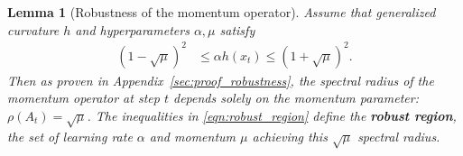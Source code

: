 \documentclass{article} %
\newtheorem{lemma}[theorem]{Lemma}
\newcommand{\mat}[1]{\bm{\mathit{#1}}}
\begin{document}
\begin{lemma}[Robustness of the momentum operator]
\label{lem:robustness}
Assume that generalized curvature $h$ and hyperparameters $\alpha,\mu$ satisfy
\begin{align}
{(1-\sqrt{\mu})^2} &\leq \alpha h(x_t) \leq {(1+\sqrt{\mu})^2}.
\label{eqn:robust_region}
\end{align}
Then as proven in Appendix~\ref{sec:proof_robustness}, the spectral radius of the momentum operator at step $t$ depends solely on the  momentum parameter: $	\rho(\mat{A}_t) = \sqrt{\mu}$. 
The inequalities in \eqref{eqn:robust_region} define the {\bf robust region}, the set of learning rate $\alpha$ and momentum $\mu$ achieving this $\sqrt{\mu}$ spectral radius.
\end{lemma}
\end{document}
